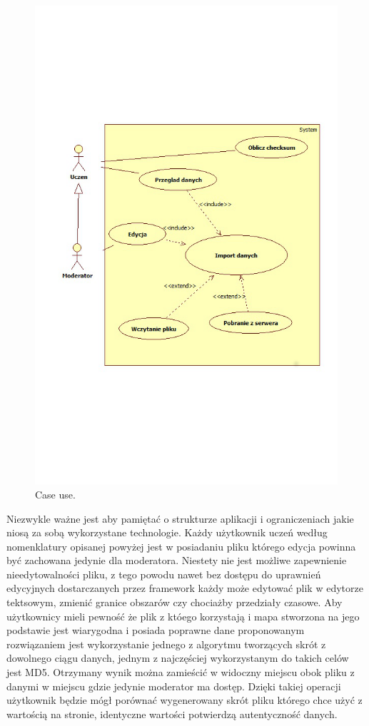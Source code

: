 \begin{figure}[H]
  \centering
    \includegraphics[width=120mm]{ge/caseuse.jpg}
  \caption{Case use.}
  \label{fig:caseuse}
\end{figure}

Niezwykle ważne jest aby pamiętać o strukturze aplikacji i ograniczeniach jakie niosą za sobą wykorzystane technologie. Każdy użytkownik uczeń według nomenklatury opisanej powyżej jest w posiadaniu pliku którego edycja powinna być zachowana jedynie dla moderatora. Niestety nie jest możliwe zapewnienie nieedytowalności pliku, z tego powodu nawet bez dostępu do uprawnień edycyjnych dostarczanych przez framework każdy może edytować plik w edytorze tektsowym, zmienić granice obszarów czy chociażby przedziały czasowe. Aby użytkownicy mieli pewność że plik z któego korzystają i mapa stworzona na jego podstawie jest wiarygodna i posiada poprawne dane proponowanym rozwiązaniem jest wykorzystanie jednego z algorytmu tworzących skrót z dowolnego ciągu danych, jednym z najczęściej wykorzystanym do takich celów jest MD5. Otrzymany wynik można zamieścić w widoczny miejscu obok pliku z danymi w miejscu gdzie jedynie moderator ma dostęp. Dzięki takiej operacji użytkownik będzie mógł porównać wygenerowany skrót pliku którego chce użyć z wartością na stronie, identyczne wartości potwierdzą autentyczność danych.

